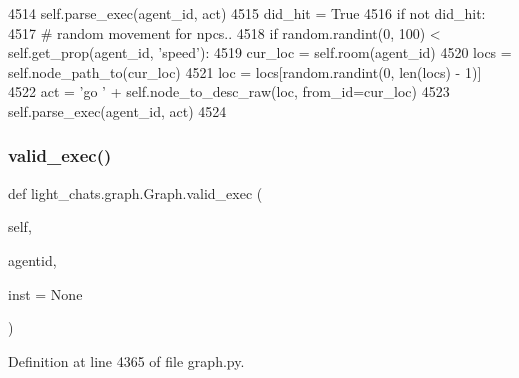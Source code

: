 \begin{DoxyCode}
4514                         self.parse\_exec(agent\_id, act)
4515                         did\_hit = \textcolor{keyword}{True}
4516             \textcolor{keywordflow}{if} \textcolor{keywordflow}{not} did\_hit:
4517                 \textcolor{comment}{# random movement for npcs..}
4518                 \textcolor{keywordflow}{if} random.randint(0, 100) < self.get\_prop(agent\_id, \textcolor{stringliteral}{'speed'}):
4519                     cur\_loc = self.room(agent\_id)
4520                     locs = self.node\_path\_to(cur\_loc)
4521                     loc = locs[random.randint(0, len(locs) - 1)]
4522                     act = \textcolor{stringliteral}{'go '} + self.node\_to\_desc\_raw(loc, from\_id=cur\_loc)
4523                     self.parse\_exec(agent\_id, act)
4524 \end{DoxyCode}
\mbox{\label{classlight__chats_1_1graph_1_1Graph_accd7dfd84e4f2bee3fc3fbac8d8577cd}} 
\subsubsection{\texorpdfstring{valid\+\_\+exec()}{valid\_exec()}}
{\footnotesize\ttfamily def light\+\_\+chats.\+graph.\+Graph.\+valid\+\_\+exec (\begin{DoxyParamCaption}\item[{}]{self,  }\item[{}]{agentid,  }\item[{}]{inst = {\ttfamily None} }\end{DoxyParamCaption})}



Definition at line 4365 of file graph.\+py.


